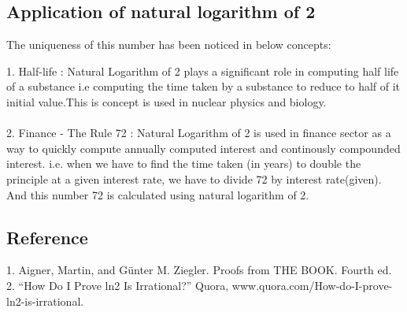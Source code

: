 \documentclass{article}
\begin{document}
\subsection*{Application of natural logarithm of 2}
The uniqueness of this number has been noticed in below concepts:

1. Half-life : Natural Logarithm of 2 plays a significant role in computing half life of a substance i.e computing the time taken by a substance to reduce to half of it initial value.This is concept is used in nuclear physics and biology.\\\\
2. Finance - The Rule 72 : Natural Logarithm of 2 is used in finance sector as a way to quickly compute annually computed interest and continously compounded interest.  i.e. when we have to find the time taken (in years) to double the principle at a given interest rate, we have to divide 72 by interest rate(given). And this number 72 is calculated using natural logarithm of 2.

\subsection*{Reference}
1. Aigner, Martin, and Günter M. Ziegler. Proofs from THE BOOK. Fourth ed.\\
2. “How Do I Prove ln2 Is Irrational?” Quora, www.quora.com/How-do-I-prove-ln2-is-irrational.
\end{document}
